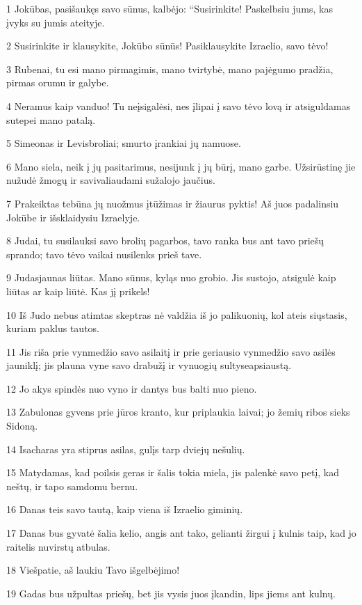 \par 1 Jokūbas, pasišaukęs savo sūnus, kalbėjo: “Susirinkite! Paskelbsiu jums, kas įvyks su jumis ateityje. 
\par 2 Susirinkite ir klausykite, Jokūbo sūnūs! Pasiklausykite Izraelio, savo tėvo! 
\par 3 Rubenai, tu esi mano pirmagimis, mano tvirtybė, mano pajėgumo pradžia, pirmas orumu ir galybe. 
\par 4 Neramus kaip vanduo! Tu neįsigalėsi, nes įlipai į savo tėvo lovą ir atsiguldamas sutepei mano patalą. 
\par 5 Simeonas ir Levis­broliai; smurto įrankiai jų namuose. 
\par 6 Mano siela, neik į jų pasitarimus, nesijunk į jų būrį, mano garbe. Užsirūstinę jie nužudė žmogų ir savivaliaudami sužalojo jaučius. 
\par 7 Prakeiktas tebūna jų nuožmus įtūžimas ir žiaurus pyktis! Aš juos padalinsiu Jokūbe ir išsklaidysiu Izraelyje. 
\par 8 Judai, tu susilauksi savo brolių pagarbos, tavo ranka bus ant tavo priešų sprando; tavo tėvo vaikai nusilenks prieš tave. 
\par 9 Judas­jaunas liūtas. Mano sūnus, kyląs nuo grobio. Jis sustojo, atsigulė kaip liūtas ar kaip liūtė. Kas jį prikels! 
\par 10 Iš Judo nebus atimtas skeptras nė valdžia iš jo palikuonių, kol ateis siųstasis, kuriam paklus tautos. 
\par 11 Jis riša prie vynmedžio savo asilaitį ir prie geriausio vynmedžio savo asilės jauniklį; jis plauna vyne savo drabužį ir vynuogių sultyse­apsiaustą. 
\par 12 Jo akys spindės nuo vyno ir dantys bus balti nuo pieno. 
\par 13 Zabulonas gyvens prie jūros kranto, kur priplaukia laivai; jo žemių ribos sieks Sidoną. 
\par 14 Isacharas yra stiprus asilas, gulįs tarp dviejų nešulių. 
\par 15 Matydamas, kad poilsis geras ir šalis tokia miela, jis palenkė savo petį, kad neštų, ir tapo samdomu bernu. 
\par 16 Danas teis savo tautą, kaip viena iš Izraelio giminių. 
\par 17 Danas bus gyvatė šalia kelio, angis ant tako, gelianti žirgui į kulnis taip, kad jo raitelis nuvirstų atbulas. 
\par 18 Viešpatie, aš laukiu Tavo išgelbėjimo! 
\par 19 Gadas bus užpultas priešų, bet jis vysis juos įkandin, lips jiems ant kulnų. 
